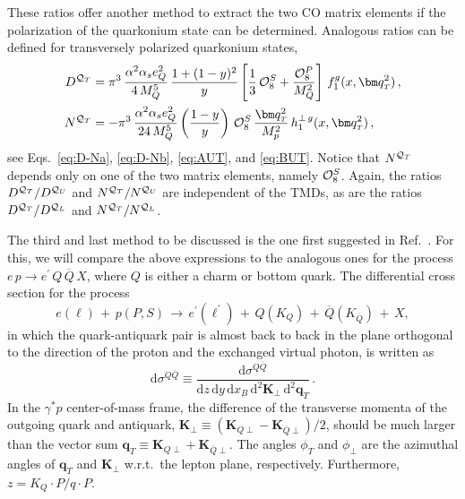 \documentclass[prd,aps,preprintnumbers,nofootinbib,superscriptaddress]{revtex4}
\newcommand{\xB}{x_{\scriptscriptstyle B}}
\newcommand{\sT}{{\scriptscriptstyle T}}
\renewcommand{\d}{\mathrm{d}}
\begin{document}
These ratios offer another method to extract the two CO matrix elements if the polarization of the quarkonium state can be determined. 
Analogous ratios can be defined for transversely polarized quarkonium states,
\begin{align}
D^{{\cal Q}_T}
& = \pi^3 \,   \frac{\alpha^2 \alpha_s e^2_Q}{ 4\, M_Q^5}  \, \frac{1+(1-y)^2}{y}\left [ \frac{1}{3}\, {\cal O}_{8}^S+ 
\frac{{\cal O}_{8}^P}{M_{Q}^{2}} \right ] \,f_1^g(x, \bm q_\sT^2) \,, \\
N^{{\cal Q}_T} 
&= - \pi ^3 \, \frac{\alpha^2 \alpha_s e^2_Q}{ 24\, M_Q^5} \left ( \frac{1-y}{y} \right  ) \,  {\cal O}_8^S \, \frac{\bm q_\sT^2}{ M_p^2}\,h_1^{\perp\, g}(x, \bm q_\sT^2) \,,
\end{align}
see Eqs.~\eqref{eq:D-Na}, \eqref{eq:D-Nb},  \eqref{eq:AUT}, and \eqref{eq:BUT}. Notice that $N^{{\cal Q}_T}$ depends only on one of the two matrix elements, namely ${\cal O}_8^S$. Again, the ratios $D^{{\cal Q}_T}/D^{{\cal Q}_{U}}$ and $N^{{\cal Q}_T}/N^{{\cal Q}_{U}}$ are independent of the TMDs, as are the ratios $D^{{\cal Q}_T}/D^{{\cal Q}_{L}}$ and $N^{{\cal Q}_T}/N^{{\cal Q}_{L}}$.

The third and last method to be discussed is the one first suggested in Ref.~\cite{Bacchetta:2018ivt}. For this, we will compare the above expressions to the analogous ones for the process $e\, p \to e^\prime \,Q \,\overline{Q}\, X$, where $Q$ is either a charm or bottom quark. The differential cross section for the process 
\begin{equation}
 e(\ell) \,+\,p (P,S)\,\to \,e^\prime(\ell^\prime) \,+\, Q(K_Q)\,+\,\overline{Q}(K_{\overline Q})\,+\,X,
 \end{equation}
 in which the quark-antiquark pair is almost back to back in the plane orthogonal to the direction of the proton and the exchanged virtual photon, is written as~\cite{Boer:2010zf,Pisano:2013cya,Boer:2016fqd}
\begin{equation}
 \d\sigma^{Q\overline Q} \equiv \frac{\d\sigma^{Q \overline Q}}{\d z \,\d y\,\d\xB\,\d^2 \bm{K}_{\perp} \,\d^2 \bm{q}_{\sT} }\,.
\end{equation}
In the $\gamma^*p$ center-of-mass frame, the difference of the transverse momenta of the outgoing quark and  antiquark, $\bm K_\perp \equiv (\bm K_{Q\perp}-\bm K_{\overline Q \perp})/2$, should be much larger than the vector sum $\bm q_\sT \equiv \bm K_{Q\perp}+\bm K_{\overline Q \perp}$. The angles $\phi_\sT$ and $\phi_\perp$ are the azimuthal angles of $\bm q_\sT$ and $\bm K_\perp$ w.r.t.\ the lepton plane, respectively. Furthermore, $z = K_Q \cdot  P/ q\cdot P$. 
\end{document}
